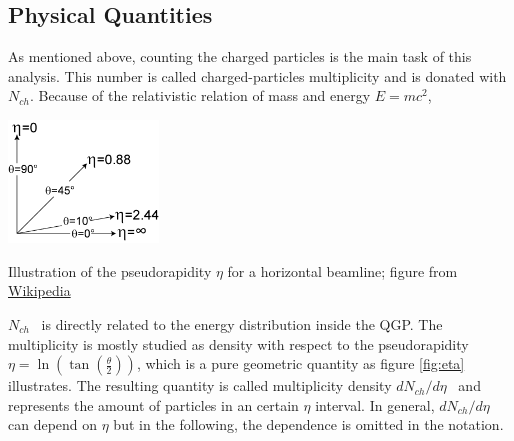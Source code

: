 \documentclass{article}
\newcommand\Nch{$N_{ch}$}
\newcommand\dNdEta{$dN_{ch}/d\eta$}
\begin{document}
\subsection{Physical Quantities}
As mentioned above, counting the charged particles is the main task of this analysis. This number is called charged-particles multiplicity and is donated with \Nch. Because of the relativistic relation of mass and energy $E=m c^2$,
\begin{floatingfigure}[r]{60mm}
\centering
\includegraphics[width=40mm, natwidth=270, natheight=220]{images/Pseudorapidity.png}
\caption{Illustration of the pseudorapidity $\eta$ for a horizontal beamline; figure from \href{https://en.wikipedia.org/wiki/Pseudorapidity}{Wikipedia}}
\label{fig:eta}
\end{floatingfigure}
\noindent \Nch~ is directly related to the energy distribution inside the QGP. The multiplicity is mostly studied as density with respect to the pseudorapidity $\eta = \ln(\tan(\frac{\theta}{2}))$, which is a pure geometric quantity as figure \ref{fig:eta} illustrates. The resulting quantity is called multiplicity density \dNdEta~ and represents the amount of particles in an certain $\eta$ interval. In general, \dNdEta~ can depend on $\eta$ but in the following, the dependence is omitted in the notation.\\
\end{document}
